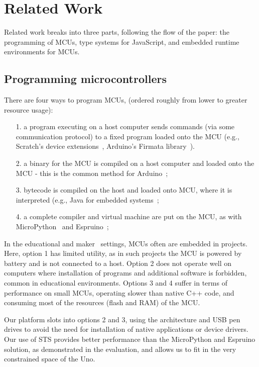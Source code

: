 \section{Related Work}
\label{sec:related}

Related work breaks into three parts, following the
flow of the paper: the programming of MCUs,
type systems for JavaScript, and embedded runtime environments
for MCUs.

\subsection{Programming microcontrollers}

There are four ways to program MCUs,
(ordered roughly from lower to greater resource usage):
\begin{itemize}
\item[1.] a program executing on a host computer sends commands (via some communication protocol)
to a fixed program loaded onto the MCU (e.g., Scratch's
device extensions~\cite{ScratchCACM2009}, Arduino's Firmata library~\cite{Firmata}).
\item[2.] a binary for the MCU is compiled on a host computer and loaded onto the MCU -
this is the common method for Arduino~\cite{buildingArduino2014};
\item[3.] bytecode is compiled on the host and loaded onto MCU, where it is interpreted
(e.g., Java for embedded systems~\cite{ClausenTOPLAS};
\item[4.] a complete compiler and virtual machine are put on the MCU,
as with MicroPython~\cite{MicroPython} and Espruino~\cite{espruinoBook};
\end{itemize}

In the educational and maker~\cite{dougherty2012maker} settings, MCUs often are embedded in projects. Here, option 1 has limited utility, as in such projects the MCU is powered by battery and is not connected to a host. Option 2 does not operate well on computers where installation of programs and additional software is forbidden, common in educational environments. Options 3 and 4 suffer in terms of performance on small MCUs, operating slower than native C++ code, and consuming most of the resources (flash and RAM) of the MCU.

Our platform slots into options 2 and 3, using the \MC architecture and USB pen drives to avoid
the need for installation of native applications or device drivers. Our use of STS provides
better performance than the MicroPython and Espruino solution, as demonstrated in the evaluation,
and allows us to fit in the very constrained space of the Uno. 

